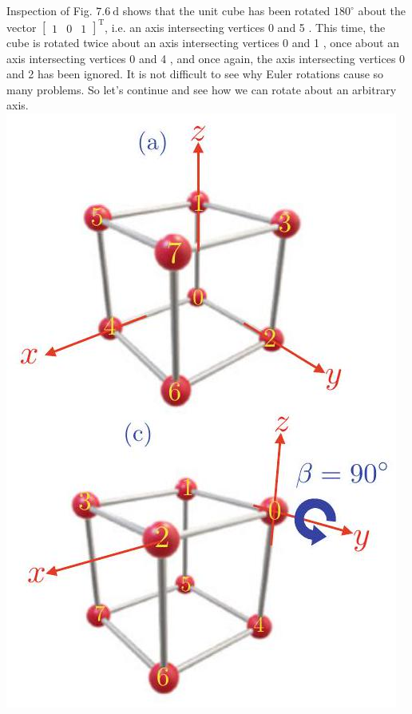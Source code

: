 \documentclass[10pt]{article}
\begin{document}
Inspection of Fig. $7.6 \mathrm{~d}$ shows that the unit cube has been rotated $180^{\circ}$ about the vector $\left[\begin{array}{lll}1 & 0 & 1\end{array}\right]^{\mathrm{T}}$, i.e. an axis intersecting vertices 0 and 5 . This time, the cube is rotated twice about an axis intersecting vertices 0 and 1 , once about an axis intersecting vertices 0 and 4 , and once again, the axis intersecting vertices 0 and 2 has been ignored. It is not difficult to see why Euler rotations cause so many problems. So let's continue and see how we can rotate about an arbitrary axis.
\includegraphics[max width=\textwidth, center]{2023_04_20_41f1ceac5a31dc7d1b59g-120(6)}
\end{document}
